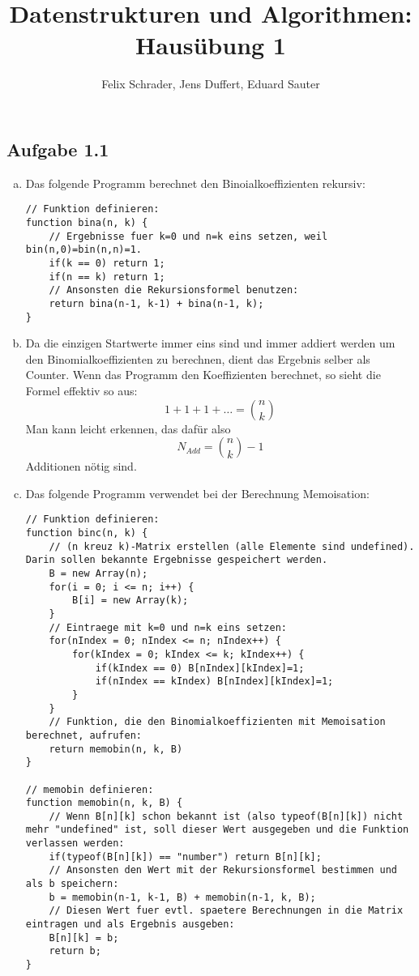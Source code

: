 \documentclass[11pt]{article}
\author{Felix Schrader, Jens Duffert, Eduard Sauter}
\title{Datenstrukturen und Algorithmen: Haus\"ubung 1}
\begin{document}
\maketitle

\subsection*{Aufgabe 1.1}
\begin{enumerate}[a)]

\item Das folgende Programm berechnet den Binoialkoeffizienten rekursiv:

\begin{lstlisting}
// Funktion definieren:
function bina(n, k) {
	// Ergebnisse fuer k=0 und n=k eins setzen, weil bin(n,0)=bin(n,n)=1.
	if(k == 0) return 1;
	if(n == k) return 1;
	// Ansonsten die Rekursionsformel benutzen:
	return bina(n-1, k-1) + bina(n-1, k);
}
\end{lstlisting}

\item Da die einzigen Startwerte immer eins sind und immer addiert werden um den Binomialkoeffizienten zu berechnen, dient das Ergebnis selber als Counter. Wenn das Programm den Koeffizienten berechnet, so sieht die Formel effektiv so aus:\[ 1+1+1+\dots =\binom{n}{k} \]
Man kann leicht erkennen, das daf\"ur also
\begin{equation}
N_{Add}=\binom{n}{k}-1
\end{equation}
Additionen n\"otig sind.

\item Das folgende Programm verwendet bei der Berechnung Memoisation:

\begin{lstlisting}
// Funktion definieren:
function binc(n, k) {
	// (n kreuz k)-Matrix erstellen (alle Elemente sind undefined). Darin sollen bekannte Ergebnisse gespeichert werden.
	B = new Array(n);
	for(i = 0; i <= n; i++) {
		B[i] = new Array(k);
	}
	// Eintraege mit k=0 und n=k eins setzen:
	for(nIndex = 0; nIndex <= n; nIndex++) {
		for(kIndex = 0; kIndex <= k; kIndex++) {
			if(kIndex == 0) B[nIndex][kIndex]=1;
			if(nIndex == kIndex) B[nIndex][kIndex]=1;
		}
	}
	// Funktion, die den Binomialkoeffizienten mit Memoisation berechnet, aufrufen:
	return memobin(n, k, B)
}

// memobin definieren:
function memobin(n, k, B) {
	// Wenn B[n][k] schon bekannt ist (also typeof(B[n][k]) nicht mehr "undefined" ist, soll dieser Wert ausgegeben und die Funktion verlassen werden:
	if(typeof(B[n][k]) == "number") return B[n][k];
	// Ansonsten den Wert mit der Rekursionsformel bestimmen und als b speichern:
	b = memobin(n-1, k-1, B) + memobin(n-1, k, B);
	// Diesen Wert fuer evtl. spaetere Berechnungen in die Matrix eintragen und als Ergebnis ausgeben:
	B[n][k] = b;
	return b;
}
\end{lstlisting}

\end{enumerate}
\end{document}
